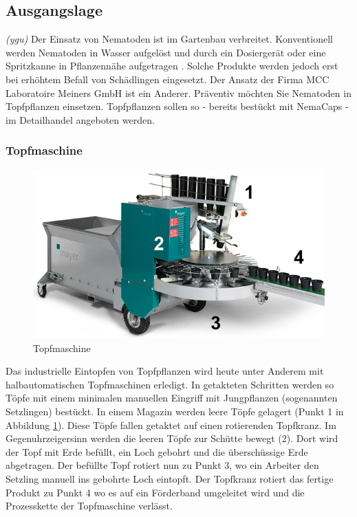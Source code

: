 
\subsection{Ausgangslage}
\textit{(ygu)} Der Einsatz von Nematoden ist im Gartenbau verbreitet. Konventionell werden Nematoden in Wasser aufgelöst und durch ein Dosiergerät oder eine Spritzkanne in Pflanzennähe aufgetragen \cite{birchmeier}. Solche Produkte werden jedoch erst bei erhöhtem Befall von Schädlingen eingesetzt. Der Ansatz der Firma MCC Laboratoire Meiners GmbH ist ein Anderer. Präventiv möchten Sie Nematoden in Topfpflanzen einsetzen. Topfpflanzen sollen so - bereits bestückt mit NemaCaps - im Detailhandel angeboten werden. 
\subsubsection{Topfmaschine}
\begin{figure}
	\includegraphics[scale=0.5]{Illustrationen/3-Einleitung/schema_topfmaschine.jpg}
	\caption{Topfmaschine}
	\label{fig:schema_topfmaschine}
\end{figure}
Das industrielle Eintopfen von Topfpflanzen wird heute unter Anderem mit halbautomatischen Topfmaschinen erledigt. In getakteten Schritten werden so Töpfe mit einem minimalen manuellen Eingriff mit Jungpflanzen (sogenannten Setzlingen) bestückt. In einem Magazin werden leere Töpfe gelagert (Punkt 1 in Abbildung \ref{fig:schema_topfmaschine}). Diese Töpfe fallen getaktet auf einen rotierenden Topfkranz. Im Gegenuhrzeigersinn werden die leeren Töpfe zur Schütte bewegt (2). Dort wird der Topf mit Erde befüllt, ein Loch gebohrt und die überschüssige Erde abgetragen. Der befüllte Topf rotiert nun zu Punkt 3, wo ein Arbeiter den Setzling manuell ins gebohrte Loch eintopft. Der Topfkranz rotiert das fertige Produkt zu Punkt 4 wo es auf ein Förderband umgeleitet wird und die Prozesskette der Topfmaschine verlässt.

